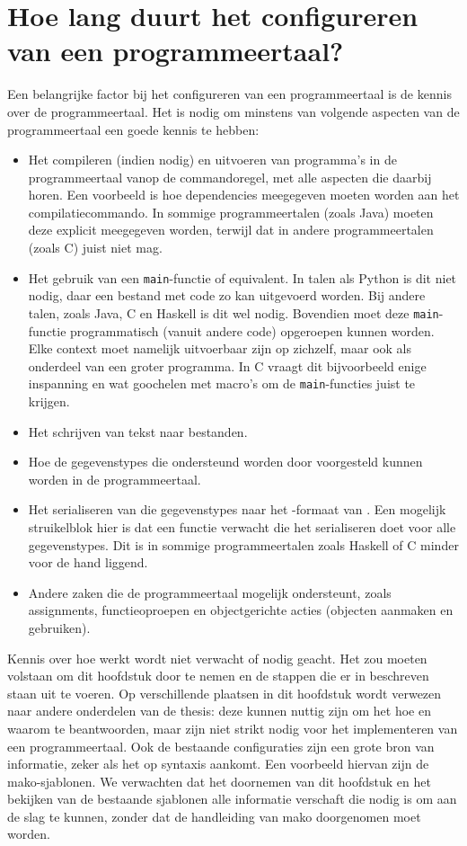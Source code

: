\section{Hoe lang duurt het configureren van een programmeertaal?}\label{sec:hoe-lang-duurt-het-implementeren-van-een-programmeertaal?}

Een belangrijke factor bij het configureren van een programmeertaal is de kennis over de programmeertaal.
Het is nodig om minstens van volgende aspecten van de programmeertaal een goede kennis te hebben:

\begin{itemize}
    \item Het compileren (indien nodig) en uitvoeren van programma's in de programmeertaal vanop de commandoregel, met alle aspecten die daarbij horen.
    Een voorbeeld is hoe dependencies meegegeven moeten worden aan het compilatiecommando.
    In sommige programmeertalen (zoals Java) moeten deze explicit meegegeven worden, terwijl dat in andere programmeertalen (zoals C) juist niet mag.
    \item Het gebruik van een \texttt{main}-functie of equivalent.
    In talen als Python is dit niet nodig, daar een bestand met code zo kan uitgevoerd worden.
    Bij andere talen, zoals Java, C en Haskell is dit wel nodig.
    Bovendien moet deze \texttt{main}-functie programmatisch (vanuit andere code) opgeroepen kunnen worden.
    Elke context moet namelijk uitvoerbaar zijn op zichzelf, maar ook als onderdeel van een groter programma.
    In C vraagt dit bijvoorbeeld enige inspanning en wat goochelen met macro's om de \texttt{main}-functies juist te krijgen.
    \item Het schrijven van tekst naar bestanden.
    \item Hoe de gegevenstypes die ondersteund worden door \tested{} voorgesteld kunnen worden in de programmeertaal.
    \item Het serialiseren van die gegevenstypes naar het -formaat van \tested{}.
    Een mogelijk struikelblok hier is dat \tested{} een functie verwacht die het serialiseren doet voor alle gegevenstypes.
    Dit is in sommige programmeertalen zoals Haskell of C minder voor de hand liggend.
    \item Andere zaken die de programmeertaal mogelijk ondersteunt, zoals assignments, functieoproepen en objectgerichte acties (objecten aanmaken en gebruiken).
\end{itemize}

Kennis over hoe \tested{} werkt wordt niet verwacht of nodig geacht.
Het zou moeten volstaan om dit hoofdstuk door te nemen en de stappen die er in beschreven staan uit te voeren.
Op verschillende plaatsen in dit hoofdstuk wordt verwezen naar andere onderdelen van de thesis: deze kunnen nuttig zijn om het hoe en waarom te beantwoorden, maar zijn niet strikt nodig voor het implementeren van een programmeertaal.
Ook de bestaande configuraties zijn een grote bron van informatie, zeker als het op syntaxis aankomt.
Een voorbeeld hiervan zijn de mako-sjablonen.
We verwachten dat het doornemen van dit hoofdstuk en het bekijken van de bestaande sjablonen alle informatie verschaft die nodig is om aan de slag te kunnen, zonder dat de handleiding van mako doorgenomen moet worden.

